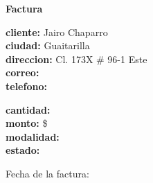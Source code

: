 \documentclass{article}
\begin{document}
\begin{center}
    {\LARGE \textbf{Factura}}\\[1cm]
\end{center}

\textbf{cliente:} Jairo Chaparro \\
\textbf{ciudad:} Guaitarilla \\
\textbf{direccion:} Cl. 173X # 96-1 Este \\
\textbf{correo:}  \\
\textbf{telefono:}  \\

\vspace{0.5cm}

\textbf{cantidad:}  \\
\textbf{monto:} \$ \\
\textbf{modalidad:}  \\
\textbf{estado:}  \\

\vspace{1cm}

Fecha de la factura: 
\end{document}
